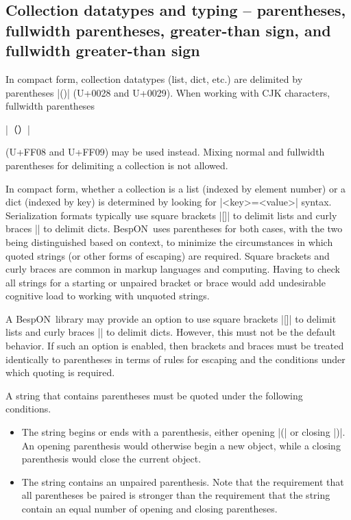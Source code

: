 \documentclass[11pt]{article}
\newcommand{\bespon}{BespON}
\begin{document}
\subsection{Collection datatypes and typing -- parentheses, fullwidth parentheses, greater-than sign, and fullwidth greater-than sign}

In compact form, collection datatypes (list, dict, etc.) are delimited by parentheses |()| (U+0028 and U+0029).  When working with CJK characters, fullwidth parentheses \begin{CJK*}{UTF8}{gkai}|（）|\end{CJK*} (U+FF08 and U+FF09) may be used instead.  Mixing normal and fullwidth parentheses for delimiting a collection is not allowed.

In compact form, whether a collection is a list (indexed by element number) or a dict (indexed by key) is determined by looking for |<key>=<value>| syntax.  Serialization formats typically use square brackets |[]| to delimit lists and curly braces |{}| to delimit dicts.  \bespon\ uses parentheses for both cases, with the two being distinguished based on context, to minimize the circumstances in which quoted strings (or other forms of escaping) are required.  Square brackets and curly braces are common in markup languages and computing.  Having to check all strings for a starting or unpaired bracket or brace would add undesirable cognitive load to working with unquoted strings.

A \bespon\ library may provide an option to use square brackets |[]| to delimit lists and curly braces |{}| to delimit dicts.  However, this must not be the default behavior.  If such an option is enabled, then brackets and braces must be treated identically to parentheses in terms of rules for escaping and the conditions under which quoting is required.

A string that contains parentheses must be quoted under the following conditions.
\begin{itemize}
\item The string begins or ends with a parenthesis, either opening |(| or closing |)|.  An opening parenthesis would otherwise begin a new object, while a closing parenthesis would close the current object.
\item The string contains an unpaired parenthesis.  Note that the requirement that all parentheses be paired is stronger than the requirement that the string contain an equal number of opening and closing parentheses.
\end{itemize}
\end{document}

